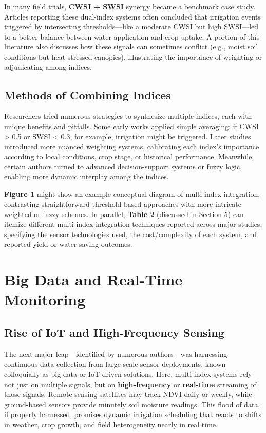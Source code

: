 \documentclass[12pt]{article}
\begin{document}
In many field trials, \textbf{CWSI + SWSI} synergy became a benchmark case study. Articles reporting these dual-index systems often concluded that irrigation events triggered by intersecting thresholds—like a moderate CWSI but high SWSI—led to a better balance between water application and crop uptake. A portion of this literature also discusses how these signals can sometimes conflict (e.g., moist soil conditions but heat-stressed canopies), illustrating the importance of weighting or adjudicating among indices.

\subsection{Methods of Combining Indices}
Researchers tried numerous strategies to synthesize multiple indices, each with unique benefits and pitfalls. Some early works applied simple averaging: if CWSI > 0.5 or SWSI < 0.3, for example, irrigation might be triggered. Later studies introduced more nuanced weighting systems, calibrating each index’s importance according to local conditions, crop stage, or historical performance. Meanwhile, certain authors turned to advanced decision-support systems or fuzzy logic, enabling more dynamic interplay among the indices.

\textbf{Figure 1} might show an example conceptual diagram of multi-index integration, contrasting straightforward threshold-based approaches with more intricate weighted or fuzzy schemes. In parallel, \textbf{Table 2} (discussed in Section 5) can itemize different multi-index integration techniques reported across major studies, specifying the sensor technologies used, the cost/complexity of each system, and reported yield or water-saving outcomes.



\section{Big Data and Real-Time Monitoring}

\subsection{Rise of IoT and High-Frequency Sensing}
The next major leap—identified by numerous authors—was harnessing continuous data collection from large-scale sensor deployments, known colloquially as big-data or IoT-driven solutions. Here, multi-index systems rely not just on multiple signals, but on \textbf{high-frequency} or \textbf{real-time} streaming of those signals. Remote sensing satellites may track NDVI daily or weekly, while ground-based sensors provide minutely soil moisture readings. This flood of data, if properly harnessed, promises dynamic irrigation scheduling that reacts to shifts in weather, crop growth, and field heterogeneity nearly in real time.
\end{document}
